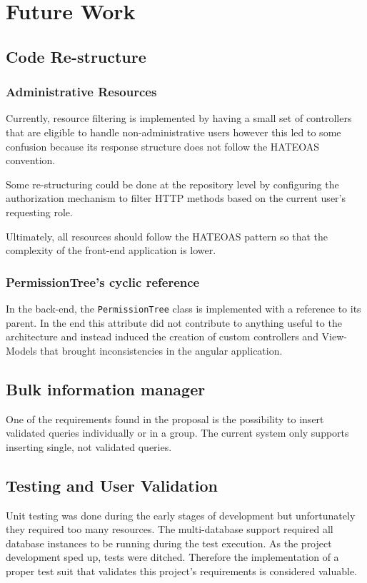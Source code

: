 \chapter{Future Work}


\section{Code Re-structure}
\subsection{Administrative Resources}
Currently, resource filtering is implemented by having a small set of controllers that are eligible to handle non-administrative users however this led to some confusion because its response structure does not follow the \gls{HATEOAS} convention.

Some re-structuring could be done at the repository level by configuring the authorization mechanism to filter \gls{HTTP} methods based on the current user's requesting role.

Ultimately, all resources should follow the \gls{HATEOAS} pattern so that the complexity of the front-end application is lower.

\subsection{PermissionTree's cyclic reference}
In the back-end, the \texttt{PermissionTree} class is implemented with a reference to its parent. In the end this attribute did not contribute to anything useful to the architecture and instead induced the creation of custom controllers and View-Models that brought inconsistencies in the angular application.

\section{Bulk information manager}
One of the requirements found in the proposal is the possibility to insert validated queries individually or in a group. The current system only supports inserting single, not validated  queries.

\section{Testing and User Validation}
Unit testing was done during the early stages of development but unfortunately they required too many resources. The multi-database support required all database instances to be running during the test execution. As the project development sped up, tests were ditched. Therefore the implementation of a proper test suit that validates this project's requirements is considered valuable.

